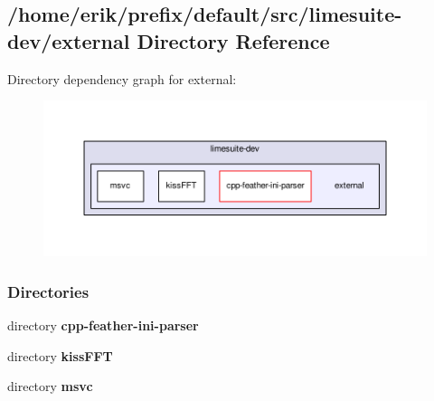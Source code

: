 \subsection{/home/erik/prefix/default/src/limesuite-\/dev/external Directory Reference}
\label{dir_b9a63e4fb359f4b8e36a9734ff3a3c46}
Directory dependency graph for external\+:
\nopagebreak
\begin{figure}[H]
\begin{center}
\leavevmode
\includegraphics[width=350pt]{dir_b9a63e4fb359f4b8e36a9734ff3a3c46_dep}
\end{center}
\end{figure}
\subsubsection*{Directories}
\begin{DoxyCompactItemize}
\item 
directory {\bf cpp-\/feather-\/ini-\/parser}
\item 
directory {\bf kiss\+F\+FT}
\item 
directory {\bf msvc}
\end{DoxyCompactItemize}

